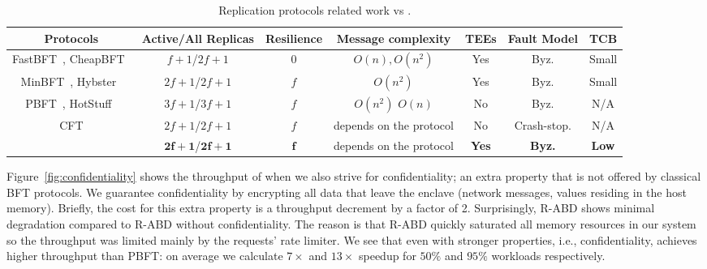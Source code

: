 \begin{table*}[h!]
\small

\begin{center}
\begin{tabular}{ |c|c|c|c|c|c|c| } 
 \hline
 Protocols & Active/All Replicas & Resilience & Message complexity & TEEs & Fault Model & TCB \\ [0.5ex] \hline \hline
 FastBFT~\cite{DBLP:journals/corr/LiuLKA16a}, CheapBFT~\cite{10.1145/2168836.2168866} & $f+1$/$2f+1$ & $0$ & $O(n), O(n^2)$ & Yes & Byz. & Small\\
 MinBFT~\cite{minBFT}, Hybster~\cite{hybster} & $2f+1$/$2f+1$ & $f$ &  $O(n^2)$ & Yes & Byz. & Small\\
 PBFT~\cite{Castro:2002}, HotStuff~\cite{DBLP:journals/corr/abs-1803-05069} & $3f+1$/$3f+1$ & $f$ & $O(n^2)$ $O(n)$ & No & Byz. & N/A\\
 CFT & $2f+1$/$2f+1$ & $f$ & depends on the protocol & No & Crash-stop. & N/A\\
 {\bf \projecttitle{}} & $\mathbf{2f+1}$/$\mathbf{2f+1}$ & ${\mathbf{f}}$ & depends on the protocol & \bf{Yes} & \bf{Byz.} & \bf{Low}\\ 
 \hline
\end{tabular}
\end{center}
\caption{Replication protocols related work vs \projecttitle{}.}
\label{tab:recipe_vs_bft}
\vspace{0pt}
\end{table*}

\fi 


 Figure~\ref{fig:confidentiality} shows the throughput of \projecttitle{} when we also strive for confidentiality; an extra property that is not offered by classical BFT protocols. We guarantee confidentiality by encrypting all data that leave the enclave (network messages, values residing in the host memory). Briefly, the cost for this extra property is a throughput decrement by a factor of 2. Surprisingly, R-ABD shows minimal degradation compared to R-ABD without confidentiality. The reason is that R-ABD quickly saturated all memory resources in our system so the throughput was limited mainly by the requests' rate limiter. We see that even with stronger properties, i.e., confidentiality, \projecttitle{} achieves higher throughput than PBFT: on average we calculate $7\times$ and $13\times$ speedup for $50\%$ and $95\%$ workloads respectively. %

